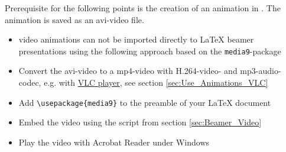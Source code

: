 \label{sec:Use_LaTeX_Animations_in_Beamer}

Prerequisite for the following points is the creation of an animation in \marktool{\paraviewname}. The animation is saved as an avi-video file.

\begin{itemize}[noitemsep]
\item \marktool{\paraviewname} video animations can not be imported directly to \LaTeX{} beamer presentations using the following approach based on the \verb+media9+-package
\item Convert the avi-video to a mp4-video with H.264-video- and mp3-audio-codec, e.g. with \href{http://www.videolan.org/index.de.html}{VLC player}, see section \ref{sec:Use_Animations_VLC}
\item Add \lstinline[style=inlinetexstyle]+\usepackage{media9}+ to the preamble of your \LaTeX{} document
\item Embed the video using the script from section \ref{sec:Beamer_Video}
\item Play the video with Acrobat Reader under Windows
\end{itemize}

